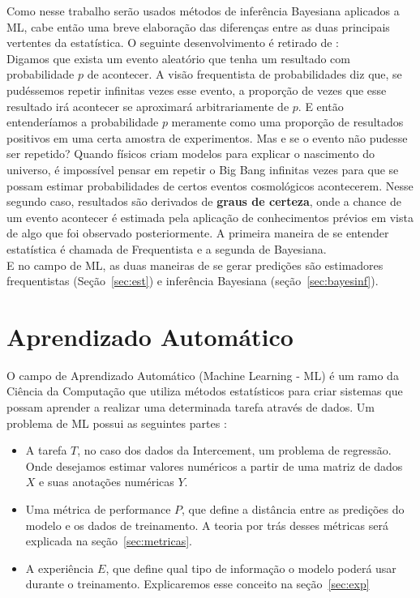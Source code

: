 Como nesse trabalho serão usados métodos de inferência Bayesiana aplicados a ML,
cabe então uma breve elaboração das diferenças entre as duas principais
vertentes da estatística. O seguinte desenvolvimento é retirado de \citep{dlbook}:\\

Digamos que exista um evento aleatório que tenha um resultado com probabilidade
$p$ de acontecer. A visão frequentista de probabilidades diz que, se pudéssemos repetir infinitas vezes esse evento, a proporção de vezes que esse resultado irá acontecer se aproximará arbitrariamente de $p$. E então entenderíamos a probabilidade $p$ meramente como uma proporção de resultados positivos em uma certa amostra de experimentos. Mas e se o evento não pudesse ser repetido? Quando físicos criam modelos para explicar o nascimento do universo, é impossível pensar em repetir o Big Bang infinitas vezes para que se possam estimar probabilidades de certos eventos cosmológicos acontecerem. Nesse segundo caso, resultados são derivados de \textbf{graus de certeza}, onde a chance de um evento acontecer é estimada pela aplicação de conhecimentos prévios em vista de algo que foi observado posteriormente. A primeira maneira de se entender estatística é chamada de Frequentista e a segunda de Bayesiana. \\

E no campo de ML, as duas maneiras de se gerar predições são estimadores
frequentistas (Seção~\ref{sec:est}) e inferência Bayesiana (seção~\ref{sec:bayesinf}).



\section{Aprendizado Automático}

O campo de Aprendizado Automático (Machine Learning - ML) é um ramo da Ciência
da Computação que utiliza métodos estatísticos para criar sistemas que possam
aprender a realizar uma determinada tarefa através de dados. Um problema de ML possui
as seguintes partes \citep{dlbook}: \\

\begin{itemize}

  
\item A tarefa $T$, no caso dos dados da Intercement, um problema de regressão.
  Onde desejamos estimar valores numéricos a partir de uma matriz de dados $X$ e
  suas anotações numéricas $Y$. 
  
\item Uma métrica de performance $P$, que define a distância entre as predições
  do modelo e os dados de treinamento. A teoria por trás desses métricas será explicada na seção~\ref{sec:metricas}.

\item A experiência $E$, que define qual tipo de informação o modelo poderá usar
  durante o treinamento. Explicaremos esse conceito na seção~\ref{sec:exp} 
  
\end{itemize}

